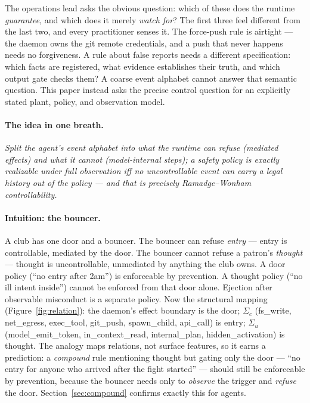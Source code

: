\documentclass[11pt,a4paper]{article}  \usepackage{mdframed} \usepackage{graphicx} \usepackage{tabularx}
\newcommand{\onebreath}[1]{\begin{center}\emph{#1}\end{center}}
\begin{document}
The operations lead asks the obvious question: which of these does the runtime \emph{guarantee}, and which does it merely
\emph{watch for}? The first three feel different from the last two, and every practitioner senses it. The force-push rule is
airtight --- the daemon owns the git remote credentials, and a push that never happens needs no forgiveness. A rule about false reports needs a different specification: which facts
are registered, what evidence establishes their truth, and which output gate
checks them? A coarse event alphabet cannot answer that semantic question.
This paper instead asks the precise control question for an explicitly stated
plant, policy, and observation model.

\paragraph{The idea in one breath.} \onebreath{Split the agent's event alphabet into what the runtime can refuse (mediated
effects) and what it cannot (model-internal steps); a safety policy is exactly realizable under full observation iff no uncontrollable event can carry a
legal history out of the policy --- and that is precisely Ramadge--Wonham controllability.}

\paragraph{Intuition: the bouncer.} A club has one door and a bouncer. The bouncer can refuse \emph{entry} --- entry is
controllable, mediated by the door. The bouncer cannot refuse a patron's \emph{thought} --- thought is uncontrollable,
unmediated by anything the club owns. A door policy (``no entry after 2am'') is enforceable by prevention. A thought policy
(``no ill intent inside'') cannot be enforced from that door alone. Ejection after observable misconduct is a separate policy. Now the structural
mapping (Figure~\ref{fig:relation}): the daemon's effect boundary is the door; $\Sigma_c$ (fs\_write, net\_egress,
exec\_tool, git\_push, spawn\_child, api\_call) is entry; $\Sigma_u$ (model\_emit\_token, in\_context\_read, internal\_plan,
hidden\_activation) is thought.
The analogy maps relations, not surface features, so it earns a prediction: a \emph{compound} rule mentioning thought but
gating only the door --- ``no entry for anyone who arrived after the fight started'' --- should still be enforceable by
prevention, because the bouncer needs only to \emph{observe} the trigger and \emph{refuse} the door.
Section~\ref{sec:compound} confirms exactly this for agents.
\end{document}
